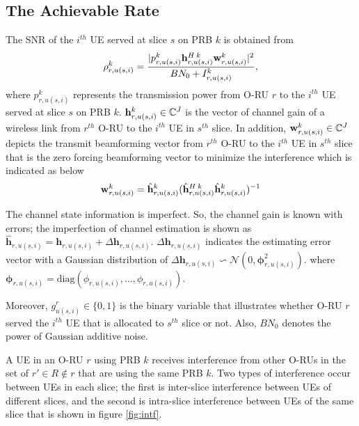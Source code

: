 \documentclass[lettersize,journal]{IEEEtran}
\begin{document}
\subsection{The Achievable Rate}
The SNR of the $i^{th}$ UE served at slice $s$ on PRB $k$ is obtained from
\begin{equation}\label{eq1}
\rho_{r,u(s,i)}^{k} =  \frac{|p_{r,u(s,i)}^{k}{\bold{h}_{r,u(s,i)}^{H \: k}} \bold{w}_{r,u(s,i)}^{k}|^2}{BN_0 + I_{r,u(s,i)}^{k}},
\end{equation}
where $p_{r,u(s,i)}^{k}$ represents the transmission power from O-RU $r$ to the $i^{th}$ UE served at slice $s$ on PRB $k$.
${\bold{h}_{r,u(s,i)}^{k}} \in \mathbb{C}^{J}$ is the vector of channel gain of a wireless link from
$r^{th}$ O-RU to the $i^{th}$ UE in $s^{th}$ slice. In addition, $\bold{w}_{r,u(s,i)}^{k} \in \mathbb{C}^{J}$ depicts the  transmit beamforming vector from $r^{th}$ O-RU to the $i^{th}$ UE in $s^{th}$ slice that is the zero forcing beamforming vector to minimize the interference which is indicated as below
\begin{equation}
\bold{w}_{r,u(s,i)}^{k} = \hat{\bold{h}}_{r,u(s,i)}^{k}(\hat{\bold{h}}_{r,u(s,i)}^{H \: k} \hat{\bold{h}}_{r,u(s,i)}^{k})^{-1}
\end{equation}

The channel state information is imperfect. So, the channel gain is known with errors; the imperfection of channel estimation is shown as
$\hat{\boldsymbol{h}}_{r,u(s,i)} = \boldsymbol{h}_{r,u(s,i)} + \Delta \boldsymbol{h}_{r,u(s,i)}$.
$\Delta \boldsymbol{h}_{r,u(s,i)}$ indicates the estimating error vector with a Gaussian distribution of
$\Delta \boldsymbol{h}_{r,u(s,i)}\backsim \mathcal{N}(0,\boldsymbol{\phi}_{r,u(s,i)}^2)$.
where $\boldsymbol{\phi}_{r,u(s,i)} = \text{diag}(\phi_{r,u(s,i)},\ldots,\phi_{r,u(s,i)}).$

Moreover, $g_{u(s,i)}^r \in \{0,1\}$ is the binary variable that illustrates whether O-RU $r$ served the $i^{th}$ UE that is allocated to $s^{th}$ slice or not.
Also, $BN_0$ denotes the power of Gaussian additive noise.

A UE in an O-RU $r$ using PRB $k$ receives interference from other O-RUs in the set of $r' \in R \not\in r$ that are using the same PRB $k$. Two types of interference occur between UEs in each slice; the first is inter-slice interference between UEs of different slices, and the second is intra-slice interference between UEs of the same slice that is shown in figure \ref{fig:intf}.
 
\end{document}
